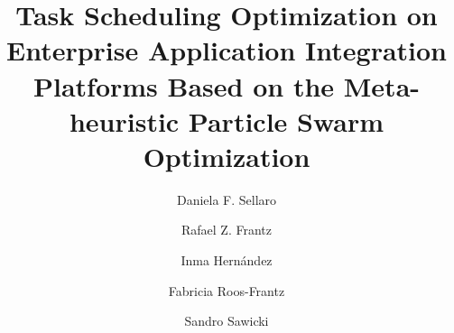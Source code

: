 \documentclass[sigconf]{acmart}
\begin{document}
	
	\title{Task Scheduling Optimization on Enterprise Application Integration Platforms Based on the Meta-heuristic Particle Swarm Optimization}
	
	
	
	\author{Daniela F. Sellaro}
	
	\author{Rafael Z. Frantz}
	
	\author{Inma Hernández}
	\affiliation{%
		\institution{University of Seville}
		\coutry{Espanha} 
	}
	
	\author{Fabricia Roos-Frantz}
	
	\author{Sandro Sawicki}
	
	
	\renewcommand{\shortauthors}{Daniela F. Sellaro et al.}
	\renewcommand{\shorttitle}{Task Scheduling Optimization on EAI Platforms Based on the Meta-heuristic PSO}
	
\end{document}
